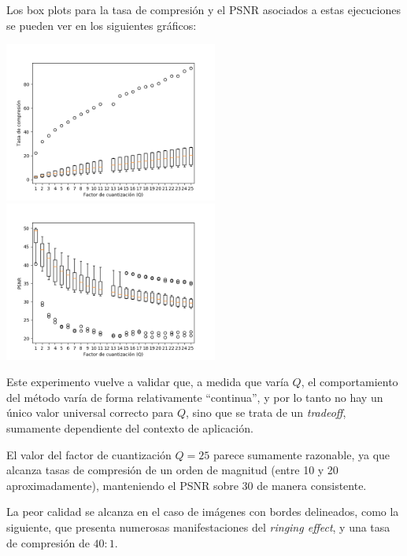 \documentclass{article}
\begin{document}
Los box plots para la tasa de compresión y el PSNR
asociados a estas ejecuciones se pueden ver en los siguientes gráficos:
\begin{center}
\includegraphics[width=7cm]{../imgs/output/gray_plots/qalt_rate.png}
\includegraphics[width=7cm]{../imgs/output/gray_plots/qalt_psnr.png}
\end{center}

Este experimento vuelve a validar que, a medida que varía $Q$,
el comportamiento del método varía de forma relativamente ``continua'',
y por lo tanto no hay un único valor universal correcto para $Q$,
sino que se trata de un {\em tradeoff}, sumamente dependiente del
contexto de aplicación.

El valor del factor de cuantización $Q = 25$ parece sumamente razonable,
ya que alcanza tasas de compresión de un orden de magnitud
(entre 10 y 20 aproximadamente), manteniendo el PSNR sobre 30
de manera consistente.

La peor calidad se alcanza en el caso de imágenes con bordes delineados,
como la siguiente, que presenta numerosas manifestaciones del {\em ringing effect},
y una tasa de compresión de $40 : 1$.
\end{document}
